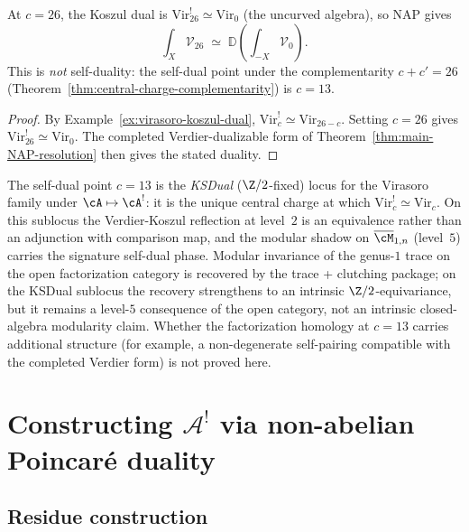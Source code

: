 \begin{example}
\begin{proposition}[Virasoro NAP duality at \texorpdfstring{$c=26$}{c=26};
\ClaimStatusConditional]
At $c = 26$, the Koszul dual is $\mathrm{Vir}_{26}^! \simeq \mathrm{Vir}_0$
(the uncurved algebra), so NAP gives
\[
\int_X \mathcal{V}_{26}
\;\simeq\;
\mathbb{D}\!\left(\int_{-X} \mathcal{V}_0\right).
\]
This is \emph{not} self-duality: the self-dual point under
the complementarity $c + c' = 26$
(Theorem~\textup{\ref{thm:central-charge-complementarity}})
is $c = 13$.
\end{proposition}

\begin{proof}
By Example~\ref{ex:virasoro-koszul-dual},
$\mathrm{Vir}_c^! \simeq \mathrm{Vir}_{26-c}$. Setting $c = 26$
gives $\mathrm{Vir}_{26}^! \simeq \mathrm{Vir}_0$.
The completed Verdier-dualizable form of
Theorem~\ref{thm:main-NAP-resolution} then gives the stated duality.
\end{proof}

\begin{remark}
\label{rem:c13-ksdual-poincare}
The self-dual point $c = 13$ is the \emph{KSDual} ($\Z/2$-fixed) locus
for the Virasoro family under $\cA \mapsto \cA^!$: it is the unique
central charge at which $\mathrm{Vir}_c^! \simeq \mathrm{Vir}_c$. On
this sublocus the Verdier-Koszul reflection at level~$2$ is an
equivalence rather than an adjunction with comparison map, and the
modular shadow on $\overline{\cM}_{1,n}$ \textup{(}level~$5$\textup{)}
carries the signature self-dual phase. Modular invariance of the
genus-$1$ trace on the open factorization category is recovered by
the trace + clutching package; on the KSDual sublocus the recovery
strengthens to an intrinsic $\Z/2$-equivariance, but it remains a
level-$5$ consequence of the open category, not an intrinsic
closed-algebra modularity claim. Whether the factorization homology
at $c = 13$ carries additional structure \textup{(}for example, a
non-degenerate self-pairing compatible with the completed Verdier
form\textup{)} is not proved here.
\end{remark}
\end{example}

\section{\texorpdfstring{Constructing $\mathcal{A}^!$ via non-abelian Poincar\'e duality}{Constructing the Koszul dual via NAP}}

\subsection{Residue construction}
\label{alg:NAP-koszul}

